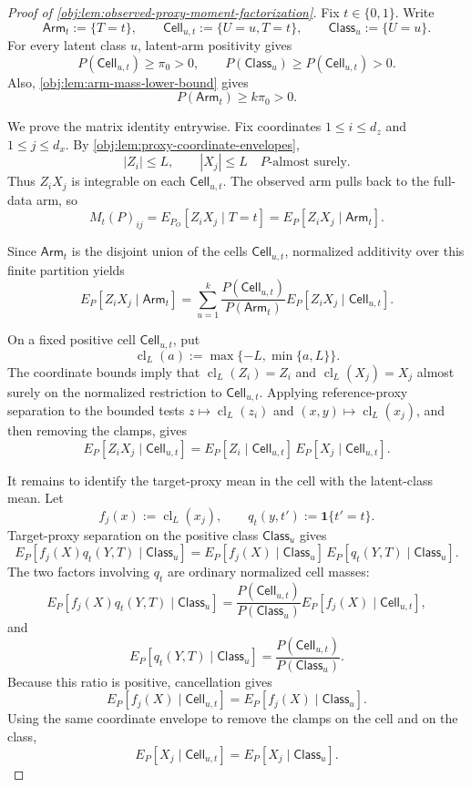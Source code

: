 \documentclass[11pt]{article}
\begin{document}
\begin{proof}[Proof of \cref{obj:lem:observed-proxy-moment-factorization}]
Fix \(t\in\{0,1\}\).  Write
\[
\mathsf{Arm}_t:=\{T=t\},\qquad
\mathsf{Cell}_{u,t}:=\{U=u,T=t\},\qquad
\mathsf{Class}_u:=\{U=u\}.
\]
For every latent class \(u\), latent-arm positivity gives
\[
P(\mathsf{Cell}_{u,t})\ge \pi_0>0,
\qquad
P(\mathsf{Class}_u)\ge P(\mathsf{Cell}_{u,t})>0.
\]
Also, \cref{obj:lem:arm-mass-lower-bound} gives
\[
P(\mathsf{Arm}_t)\ge k\pi_0>0 .
\]

We prove the matrix identity entrywise.  Fix coordinates \(1\le i\le d_z\) and \(1\le j\le d_x\).  By \cref{obj:lem:proxy-coordinate-envelopes},
\[
|Z_i|\le L,\qquad |X_j|\le L
\quad\text{\(P\)-almost surely.}
\]
Thus \(Z_iX_j\) is integrable on each \(\mathsf{Cell}_{u,t}\).  The observed arm pulls back to the full-data arm, so
\[
M_t(P)_{ij}
=
E_{P_O}[Z_iX_j\mid T=t]
=
E_P[Z_iX_j\mid \mathsf{Arm}_t].
\]

Since \(\mathsf{Arm}_t\) is the disjoint union of the cells
\(\mathsf{Cell}_{u,t}\), normalized additivity over this finite partition yields
\[
E_P[Z_iX_j\mid \mathsf{Arm}_t]
=
\sum_{u=1}^{k}
\frac{P(\mathsf{Cell}_{u,t})}{P(\mathsf{Arm}_t)}
E_P[Z_iX_j\mid \mathsf{Cell}_{u,t}].
\]

On a fixed positive cell \(\mathsf{Cell}_{u,t}\), put
\[
\operatorname{cl}_L(a):=\max\{-L,\min\{a,L\}\}.
\]
The coordinate bounds imply that \(\operatorname{cl}_L(Z_i)=Z_i\) and
\(\operatorname{cl}_L(X_j)=X_j\) almost surely on the normalized restriction to
\(\mathsf{Cell}_{u,t}\).  Applying reference-proxy separation to the bounded
tests \(z\mapsto \operatorname{cl}_L(z_i)\) and
\((x,y)\mapsto \operatorname{cl}_L(x_j)\), and then removing the clamps, gives
\[
E_P[Z_iX_j\mid \mathsf{Cell}_{u,t}]
=
E_P[Z_i\mid \mathsf{Cell}_{u,t}]\,
E_P[X_j\mid \mathsf{Cell}_{u,t}].
\]

It remains to identify the target-proxy mean in the cell with the latent-class
mean.  Let
\[
f_j(x):=\operatorname{cl}_L(x_j),
\qquad
q_t(y,t'):=\mathbf 1\{t'=t\}.
\]
Target-proxy separation on the positive class \(\mathsf{Class}_u\) gives
\[
E_P[f_j(X)q_t(Y,T)\mid \mathsf{Class}_u]
=
E_P[f_j(X)\mid \mathsf{Class}_u]\,
E_P[q_t(Y,T)\mid \mathsf{Class}_u].
\]
The two factors involving \(q_t\) are ordinary normalized cell masses:
\[
E_P[f_j(X)q_t(Y,T)\mid \mathsf{Class}_u]
=
\frac{P(\mathsf{Cell}_{u,t})}{P(\mathsf{Class}_u)}
E_P[f_j(X)\mid \mathsf{Cell}_{u,t}],
\]
and
\[
E_P[q_t(Y,T)\mid \mathsf{Class}_u]
=
\frac{P(\mathsf{Cell}_{u,t})}{P(\mathsf{Class}_u)}.
\]
Because this ratio is positive, cancellation gives
\[
E_P[f_j(X)\mid \mathsf{Cell}_{u,t}]
=
E_P[f_j(X)\mid \mathsf{Class}_u].
\]
Using the same coordinate envelope to remove the clamps on the cell and on the
class,
\[
E_P[X_j\mid \mathsf{Cell}_{u,t}]
=
E_P[X_j\mid \mathsf{Class}_u].
\]


\end{proof}
\end{document}
